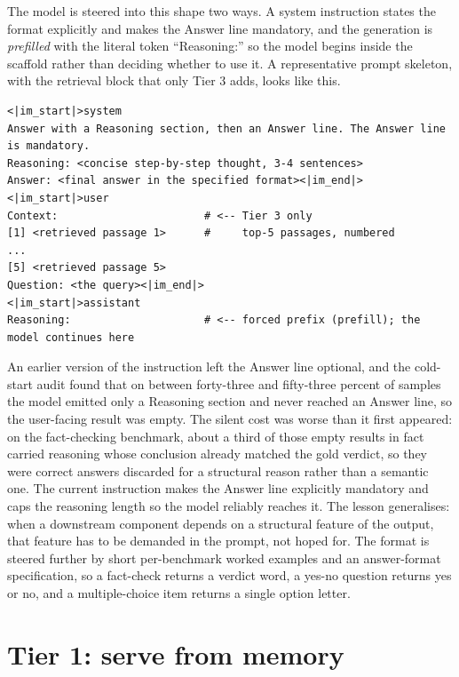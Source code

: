 The model is steered into this shape two ways. A system instruction states the format
explicitly and makes the Answer line mandatory, and the generation is \emph{prefilled}
with the literal token ``Reasoning:'' so the model begins inside the scaffold rather
than deciding whether to use it. A representative prompt skeleton, with the
retrieval block that only Tier 3 adds, looks like this.

\begin{lstlisting}[language={}, caption={The scaffolded-CoT prompt skeleton shared by Tiers 2 and 3 (Tier 3 adds the Context block).}, label={lst:prompt}]
<|im_start|>system
Answer with a Reasoning section, then an Answer line. The Answer line is mandatory.
Reasoning: <concise step-by-step thought, 3-4 sentences>
Answer: <final answer in the specified format><|im_end|>
<|im_start|>user
Context:                       # <-- Tier 3 only
[1] <retrieved passage 1>      #     top-5 passages, numbered
...
[5] <retrieved passage 5>
Question: <the query><|im_end|>
<|im_start|>assistant
Reasoning:                     # <-- forced prefix (prefill); the model continues here
\end{lstlisting}

\begin{pitfall}
An earlier version of the instruction left the Answer line optional, and the cold-start
audit found that on between forty-three and fifty-three percent of samples the model
emitted only a Reasoning section and never reached an Answer line, so the user-facing
result was empty. The silent cost was worse than it first appeared: on the fact-checking
benchmark, about a third of those empty results in fact carried reasoning whose conclusion
already matched the gold verdict, so they were correct answers discarded for a structural
reason rather than a semantic one. The current instruction makes the
Answer line explicitly mandatory and caps the reasoning length so the model reliably
reaches it. The lesson generalises: when a downstream component depends on a
structural feature of the output, that feature has to be demanded in the prompt, not
hoped for. The format is steered further by short per-benchmark worked examples and an
answer-format specification, so a fact-check returns a verdict word, a yes-no question
returns yes or no, and a multiple-choice item returns a single option letter.
\end{pitfall}

\section{Tier 1: serve from memory}
\label{sec:tiers-tier1}

